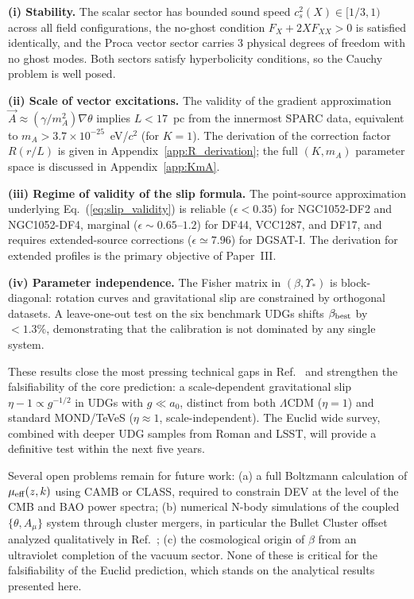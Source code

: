 \documentclass[aps,prd,reprint,floatfix,nofootinbib,superscriptaddress]{revtex4-2}
\newcommand{\aO}{a_0}
\newcommand{\mueff}{\mu_{\rm eff}}
\newcommand{\cs}{c_s}
\begin{document}
\textbf{(i) Stability.} The scalar sector has bounded sound speed
$\cs^2(X) \in [1/3,1)$ across all field configurations, the
no-ghost condition $F_X + 2X F_{XX} > 0$ is satisfied identically,
and the Proca vector sector carries 3 physical degrees of freedom
with no ghost modes. Both sectors satisfy hyperbolicity
conditions, so the Cauchy problem is well posed.

\textbf{(ii) Scale of vector excitations.} The validity of the
gradient approximation $\vec{A}\approx(\gamma/m_A^2)\nabla\theta$
implies $L<17$~pc from the innermost SPARC data, equivalent to
$m_A > 3.7\times10^{-25}$~eV/$c^2$ (for $K=1$). The derivation
of the correction factor $R(r/L)$ is given in Appendix~\ref{app:R_derivation};
the full $(K,m_A)$ parameter space is discussed in
Appendix~\ref{app:KmA}.

\textbf{(iii) Regime of validity of the slip formula.} The
point-source approximation underlying Eq.~(\ref{eq:slip_validity})
is reliable ($\epsilon < 0.35$) for NGC1052-DF2 and NGC1052-DF4,
marginal ($\epsilon \sim 0.65$--$1.2$) for DF44, VCC1287, and DF17,
and requires extended-source corrections ($\epsilon \simeq 7.96$) for
DGSAT-I. The derivation for extended profiles is the primary
objective of Paper~III.

\textbf{(iv) Parameter independence.} The Fisher matrix in
$(\beta,\Upsilon_*)$ is block-diagonal: rotation curves and
gravitational slip are constrained by orthogonal datasets. A
leave-one-out test on the six benchmark UDGs shifts
$\beta_{\rm best}$ by $<1.3\%$, demonstrating that the calibration
is not dominated by any single system.

These results close the most pressing technical gaps in
Ref.~\cite{Mendes2026} and strengthen the falsifiability of the
core prediction: a scale-dependent gravitational slip
$\eta-1 \propto g^{-1/2}$ in UDGs with $g\ll\aO$, distinct from
both $\Lambda$CDM ($\eta=1$) and standard MOND/TeVeS
($\eta\approx 1$, scale-independent). The Euclid wide survey,
combined with deeper UDG samples from Roman and LSST, will provide
a definitive test within the next five years.

Several open problems remain for future work: (a) a full
Boltzmann calculation of $\mueff(z,k)$ using CAMB or CLASS,
required to constrain DEV at the level of the CMB and BAO
power spectra; (b) numerical N-body simulations of the coupled
$\{\theta,A_\mu\}$ system through cluster mergers, in particular
the Bullet Cluster offset analyzed qualitatively in
Ref.~\cite{Mendes2026}; (c) the cosmological origin of $\beta$
from an ultraviolet completion of the vacuum sector. None of
these is critical for the falsifiability of the Euclid prediction,
which stands on the analytical results presented here.
\end{document}
